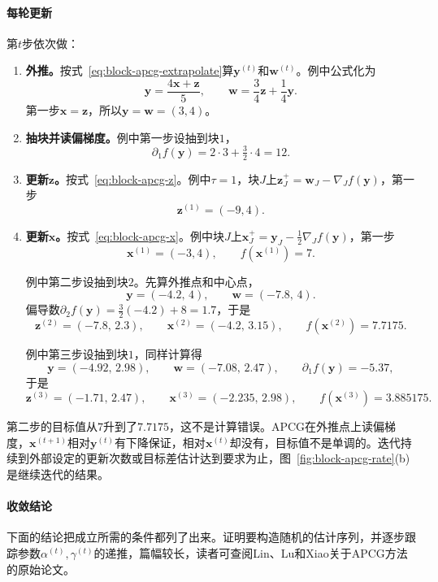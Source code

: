 \paragraph{每轮更新}
第$t$步依次做：
\begin{enumerate}
 \item \textbf{外推。}按式~\eqref{eq:block-apcg-extrapolate}算$\bm{y}^{(t)}$和$\bm{w}^{(t)}$。例中公式化为
 \[
  \bm{y}=\frac{4\bm{x}+\bm{z}}{5},\qquad \bm{w}=\frac34\bm{z}+\frac14\bm{y}.
 \]
 第一步$\bm{x}=\bm{z}$，所以$\bm{y}=\bm{w}=(3,4)$。
 \item \textbf{抽块并读偏梯度。}例中第一步设抽到块$1$，
 \[
  \partial_1f(\bm{y})=2\cdot3+\tfrac32\cdot4=12 .
 \]
 \item \textbf{更新$\bm{z}$。}按式~\eqref{eq:block-apcg-z}。例中$\tau=1$，块$J$上$\bm{z}_J^{+}=\bm{w}_J-\nabla_Jf(\bm{y})$，第一步
 \[
  \bm{z}^{(1)}=(-9,4).
 \]
 \item \textbf{更新$\bm{x}$。}按式~\eqref{eq:block-apcg-x}。例中块$J$上$\bm{x}_J^{+}=\bm{y}_J-\tfrac12\nabla_Jf(\bm{y})$，第一步
 \[
  \bm{x}^{(1)}=(-3,4),\qquad f(\bm{x}^{(1)})=7 .
 \]

 例中第二步设抽到块$2$。先算外推点和中心点，
 \[
  \bm{y}=(-4.2,\,4),\qquad \bm{w}=(-7.8,\,4).
 \]
 偏导数$\partial_2f(\bm{y})=\tfrac32(-4.2)+8=1.7$，于是
 \[
  \bm{z}^{(2)}=(-7.8,\,2.3),\qquad \bm{x}^{(2)}=(-4.2,\,3.15),\qquad f(\bm{x}^{(2)})=7.7175 .
 \]

 例中第三步设抽到块$1$，同样计算得
 \[
  \bm{y}=(-4.92,\,2.98),\qquad \bm{w}=(-7.08,\,2.47),\qquad \partial_1f(\bm{y})=-5.37 ,
 \]
 于是
 \[
  \bm{z}^{(3)}=(-1.71,\,2.47),\qquad \bm{x}^{(3)}=(-2.235,\,2.98),\qquad f(\bm{x}^{(3)})=3.885175 .
 \]
\end{enumerate}

第二步的目标值从$7$升到了$7.7175$，这不是计算错误。APCG在外推点上读偏梯度，$\bm{x}^{(t+1)}$相对$\bm{y}^{(t)}$有下降保证，相对$\bm{x}^{(t)}$却没有，目标值不是单调的。迭代持续到外部设定的更新次数或目标差估计达到要求为止，图~\ref{fig:block-apcg-rate}(b)是继续迭代的结果。

\paragraph{收敛结论}
下面的结论把成立所需的条件都列了出来。证明要构造随机的估计序列，并逐步跟踪参数$\alpha^{(t)},\gamma^{(t)}$的递推，篇幅较长，读者可查阅Lin、Lu和Xiao关于APCG方法的原始论文。

